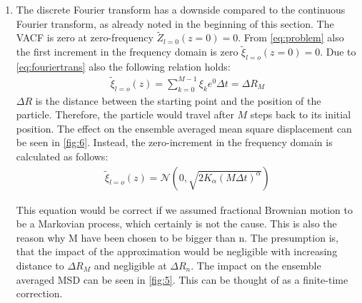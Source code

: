 \documentclass[
  a4paper,BCOR10mm,oneside,
  bibtotoc,idxtotoc,
  headsepline,footsepline,%
  fleqn,openbib
]{scrbook}
\begin{document}
\begin{enumerate}
 \item The discrete Fourier transform has a downside compared to the continuous Fourier transform, as already noted in the beginning of this section. The VACF is zero at zero-frequency $ \tilde{Z}_{l=0}(z=0)=0$.  From \cref{eq:problem} also the first increment in the frequency domain is zero $ \tilde{\xi}_{l=o}(z=0)= 0$. Due to \cref{eq:fouriertrans} also the following relation holds:
 \begin{align}
   \tilde{\xi}_{l=o}(z) = \sum_{k=0}^{M-1} \xi_k e^{0} \Delta t = \Delta  R_{M} \label{correction}
 \end{align}
$\Delta R $ is the distance between the starting point and the position of the particle. Therefore, the particle would travel after $M$ steps back to its initial position. The effect on the ensemble averaged mean square displacement can be seen in \cref{fig:6}. Instead, the zero-increment in the frequency domain is calculated as follows:
\begin{align}
 \tilde{\xi}_{l=o}(z) = \mathcal{N}(0,\sqrt{2 K_{\alpha} (M \Delta t)^\alpha})
\end{align}

\begin{figure}
\end{figure}
This equation would be correct if we assumed fractional Brownian motion to be a Markovian process, which certainly is not the cause. This is also the reason why M have been chosen to be bigger than n. The presumption is, that the impact of the approximation would be negligible with increasing distance to $\Delta R_{M}$ and negligible at $\Delta R_{n}$. The impact on the ensemble averaged MSD can be seen in \cref{fig:5}. This can be thought of as a finite-time correction.


\end{enumerate}
\end{document}
